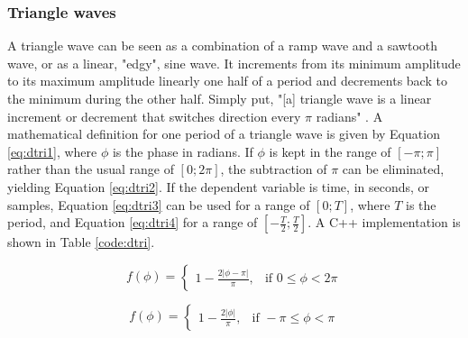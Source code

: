 \documentclass[12pt,twoside]{report}
\begin{document}
\begin{table}
\end{table}

\pagebreak

\subsubsection{Triangle waves}

A triangle wave can be seen as a combination of a ramp wave and a sawtooth wave, or as a linear, "edgy", sine wave. It increments from its minimum amplitude to its maximum amplitude linearly one half of a period and decrements back to the minimum during the other half. Simply put, "[a] triangle wave is a linear increment or decrement that switches direction every $\pi$ radians" . A mathematical definition for one period of a triangle wave is given by Equation  \ref{eq:dtri1}, where $\phi$ is the phase in radians. If $\phi$ is kept in the range of $[-\pi;\pi]$ rather than the usual range of $[0;2 \pi]$, the subtraction of $\pi$ can be eliminated, yielding Equation  \ref{eq:dtri2}. If the dependent variable is time, in seconds, or samples, Equation  \ref{eq:dtri3} can be used for a range of $[0;T]$, where $T$ is the period, and Equation  \ref{eq:dtri4} for a range of $[-\frac{T}{2};\frac{T}{2}]$. A C++ implementation is shown in Table \ref{code:dtri}.

\begin{multicols}{2}

  \begin{equation}
    f(\phi) =
    \begin{cases}
      1 - \frac{2 |\phi - \pi|}{\pi},& \text{if } 0 \leq \phi < 2 \pi
    \end{cases}
    \label{eq:dtri1}
  \end{equation}

  \begin{equation}
    f(\phi) =
    \begin{cases}
      1 - \frac{2 |\phi|}{\pi},& \text{if } -\pi \leq \phi < \pi
    \end{cases}
    \label{eq:dtri2}
  \end{equation}

\end{multicols}
\end{document}
